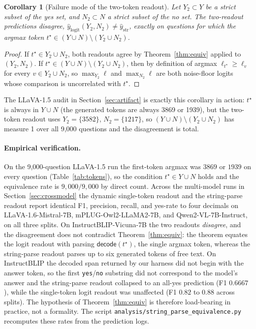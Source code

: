 \documentclass[11pt,letterpaper]{article}
\newtheorem{corollary}{Corollary}
\begin{document}
\begin{corollary}[Failure mode of the two-token readout]
\label{cor:fail}
Let $Y_2 \subset Y$ be a strict subset of the yes set, and
$N_2 \subset N$ a strict subset of the no set. The two-readout
predictions disagree, $\hat{y}_{\mathrm{logit}}(Y_2, N_2) \neq
\hat{y}_{\mathrm{str}}$, exactly on questions for which the argmax
token $t^\star \in (Y \cup N) \setminus (Y_2 \cup N_2)$.
\end{corollary}

\begin{proof}
If $t^\star \in Y_2 \cup N_2$, both readouts agree by
Theorem~\ref{thm:equiv} applied to $(Y_2, N_2)$. If
$t^\star \in (Y \cup N) \setminus (Y_2 \cup N_2)$, then by definition
of argmax $\ell_{t^\star} \geq \ell_v$ for every
$v \in Y_2 \cup N_2$, so $\max_{Y_2} \ell$ and $\max_{N_2} \ell$ are
both noise-floor logits whose comparison is uncorrelated with
$t^\star$.
\end{proof}

The LLaVA-1.5 audit in Section~\ref{sec:artifact} is exactly this
corollary in action: $t^\star$ is always in $Y \cup N$ (the
generated tokens are always 3869 or 1939), but the two-token readout
uses $Y_2 = \{3582\}$, $N_2 = \{1217\}$, so
$(Y \cup N) \setminus (Y_2 \cup N_2)$ has measure 1 over all 9{,}000
questions and the disagreement is total.

\paragraph{Empirical verification.} On the 9{,}000-question LLaVA-1.5
run the first-token argmax was $3869$ or $1939$ on every question
(Table~\ref{tab:tokens}), so the condition $t^\star \in Y \cup N$ holds
and the equivalence rate is $9{,}000/9{,}000$ by direct count. Across
the multi-model runs in Section~\ref{sec:crossmodel} the dynamic
single-token readout and the string-parse readout report identical F1,
precision, recall, and yes-rate to four decimals on
LLaVA-1.6-Mistral-7B, mPLUG-Owl2-LLaMA2-7B, and Qwen2-VL-7B-Instruct,
on all three splits. On InstructBLIP-Vicuna-7B the two readouts
\emph{disagree}, and the disagreement does not contradict
Theorem~\ref{thm:equiv}: the theorem equates the logit readout with
parsing $\textsf{decode}(t^\star)$, the single argmax token, whereas the
string-parse readout parses up to six generated tokens of free text.
On InstructBLIP the decoded span returned by our harness did not begin
with the answer token, so the first \texttt{yes}/\texttt{no} substring
did not correspond to the model's answer and the string-parse readout
collapsed to an all-yes prediction (F1 $0.6667$), while the single-token
logit readout was unaffected (F1 $0.82$ to $0.88$ across splits). The
hypothesis of Theorem~\ref{thm:equiv} is therefore load-bearing in
practice, not a formality. The script
\texttt{analysis/string\_parse\_equivalence.py} recomputes these rates
from the prediction logs.
\end{document}
